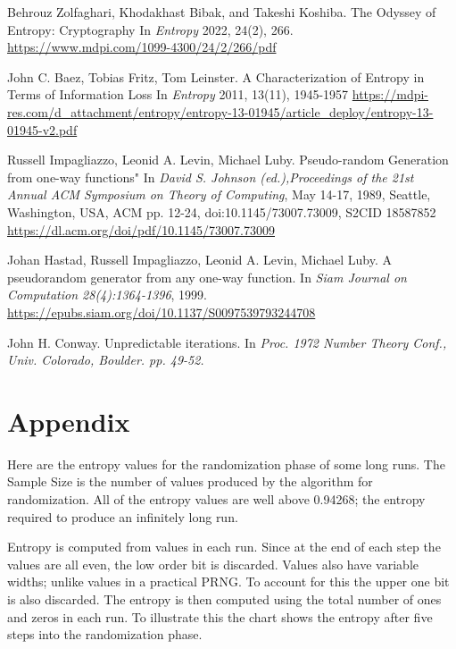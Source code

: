 \documentclass[preprint]{sigplanconf}
\begin{document}
\begin{thebibliography}{9}
    Behrouz Zolfaghari, Khodakhast Bibak, and Takeshi Koshiba.
    \newblock The Odyssey of Entropy: Cryptography
    \newblock In \emph{Entropy} 2022, 24(2), 266.
    \newline \url{https://www.mdpi.com/1099-4300/24/2/266/pdf}

    John C. Baez, Tobias Fritz, Tom Leinster.
    \newblock A Characterization of Entropy in Terms of Information Loss
    \newblock In \emph{Entropy} 2011, 13(11), 1945-1957
    \newline \url{https://mdpi-res.com/d_attachment/entropy/entropy-13-01945/article_deploy/entropy-13-01945-v2.pdf}

    Russell Impagliazzo, Leonid A. Levin, Michael Luby.
    \newblock Pseudo-random Generation from one-way functions"
    \newblock In \emph{David S. Johnson (ed.),Proceedings of the 21st Annual ACM Symposium on Theory of Computing}, May 14-17, 1989, Seattle, Washington, USA, {ACM} pp. 12-24,
    \newline doi:10.1145/73007.73009, S2CID 18587852
    \newline \url{https://dl.acm.org/doi/pdf/10.1145/73007.73009}

    Johan Hastad, Russell Impagliazzo, Leonid A. Levin, Michael Luby.
    \newblock A pseudorandom generator from any one-way function.
    \newblock In \emph{Siam Journal on Computation 28(4):1364-1396}, 1999.
    \newline \url{https://epubs.siam.org/doi/10.1137/S0097539793244708}

    John H. Conway.
    \newblock Unpredictable iterations.
    \newblock In \emph{Proc. 1972 Number Theory Conf., Univ. Colorado, Boulder. pp. 49-52.}

\end{thebibliography}

\appendix
\section{Appendix}

Here are the entropy values for the randomization phase of some long runs. The Sample Size is the number of values produced by the algorithm for randomization. All of the entropy values are well above 0.94268; the entropy required to produce an infinitely long run.

Entropy is computed from values in each run. Since at the end of each step the values are all even, the low order bit is discarded. Values also have variable widths; unlike values in a practical PRNG. To account for this the upper one bit is also discarded. The entropy is then computed using the total number of ones and zeros in each run. To illustrate this the chart shows the entropy after five steps into the randomization phase.
\end{document}
